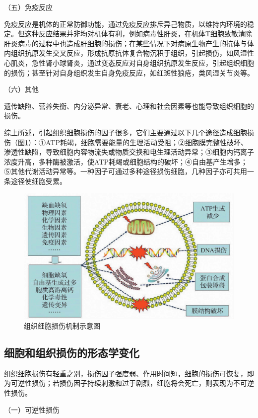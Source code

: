 {（五）免疫反应}

免疫反应是机体的正常防御功能，通过免疫反应排斥异己物质，以维持内环境的稳定。但这种反应结果并非均对机体有利，例如病毒性肝炎，在机体T细胞致敏清除肝炎病毒的过程中也造成肝细胞的损伤；在某些情况下对病原生物产生的抗体与体内组织抗原发生交叉反应，形成抗原抗体复合物沉积于组织，引起损伤，如风湿性心肌炎，急性肾小球肾炎，通过变态反应对自身组织抗原发生反应，引起组织细胞的损伤；甚至针对自身组织发生自身免疫反应，如红斑性狼疮，类风湿关节炎等。

{（六）其他}

遗传缺陷、营养失衡、内分泌异常、衰老、心理和社会因素等也能导致组织细胞的损伤。

综上所述，引起组织细胞损伤的因子很多，它们主要通过以下几个途径造成细胞损伤（图\ref{fig1-5}）：①ATP耗竭，细胞需要能量的生理活动受阻；②细胞膜完整性破坏、渗透性缺陷，导致细胞内容物流失或物质交换和电生理活动异常；③细胞内钙离子浓度升高，多种酶被激活，使ATP耗竭或细胞结构的破坏；④自由基产生增多；⑤其他代谢活动异常等。一种因子可通过多种途径损伤细胞，几种因子亦可共用一条途径使细胞受累。
\begin{figure}[!htbp]
	\centering
    \includegraphics{./images/Image00006.jpg}
	\caption{组织细胞损伤机制示意图}
	\label{fig1-5} 
	\end{figure} 

\subsection{细胞和组织损伤的形态学变化}

组织细胞损伤有轻重之别，损伤因子强度弱、作用时间短，细胞的损伤可恢复，即为可逆性损伤；若损伤因子持续刺激和过于剧烈，细胞将会死亡，则表现为不可逆性损伤。

{（一）可逆性损伤}

